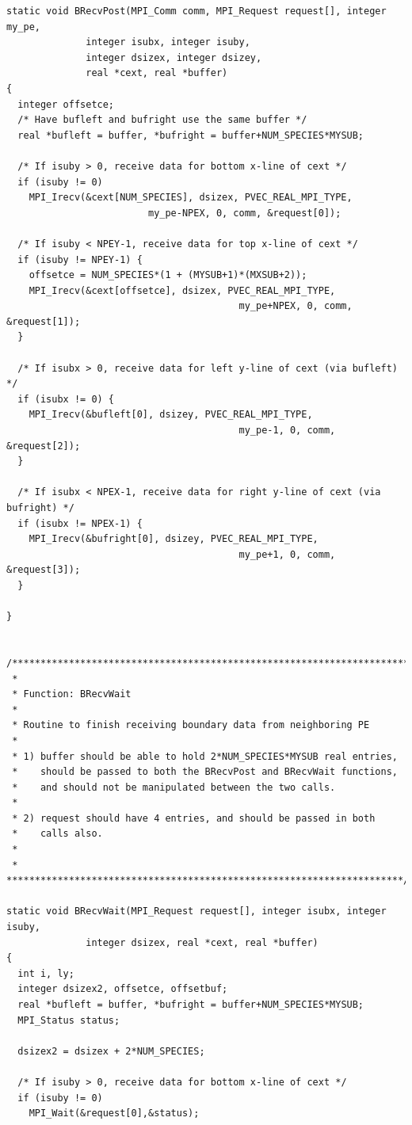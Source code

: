\documentclass[11pt]{article}
\begin{document}
\begin{verbatim}
static void BRecvPost(MPI_Comm comm, MPI_Request request[], integer my_pe,
		      integer isubx, integer isuby,
		      integer dsizex, integer dsizey,
		      real *cext, real *buffer)
{
  integer offsetce;
  /* Have bufleft and bufright use the same buffer */
  real *bufleft = buffer, *bufright = buffer+NUM_SPECIES*MYSUB;

  /* If isuby > 0, receive data for bottom x-line of cext */
  if (isuby != 0)
    MPI_Irecv(&cext[NUM_SPECIES], dsizex, PVEC_REAL_MPI_TYPE,
    					 my_pe-NPEX, 0, comm, &request[0]);

  /* If isuby < NPEY-1, receive data for top x-line of cext */
  if (isuby != NPEY-1) {
    offsetce = NUM_SPECIES*(1 + (MYSUB+1)*(MXSUB+2));
    MPI_Irecv(&cext[offsetce], dsizex, PVEC_REAL_MPI_TYPE,
                                         my_pe+NPEX, 0, comm, &request[1]);
  }

  /* If isubx > 0, receive data for left y-line of cext (via bufleft) */
  if (isubx != 0) {
    MPI_Irecv(&bufleft[0], dsizey, PVEC_REAL_MPI_TYPE,
                                         my_pe-1, 0, comm, &request[2]);
  }

  /* If isubx < NPEX-1, receive data for right y-line of cext (via bufright) */
  if (isubx != NPEX-1) {
    MPI_Irecv(&bufright[0], dsizey, PVEC_REAL_MPI_TYPE,
                                         my_pe+1, 0, comm, &request[3]);
  }

}


/***********************************************************************
 *
 * Function: BRecvWait
 *
 * Routine to finish receiving boundary data from neighboring PE
 *
 * 1) buffer should be able to hold 2*NUM_SPECIES*MYSUB real entries,
 *    should be passed to both the BRecvPost and BRecvWait functions,
 *    and should not be manipulated between the two calls.
 *
 * 2) request should have 4 entries, and should be passed in both
 *    calls also.
 *
 * **********************************************************************/

static void BRecvWait(MPI_Request request[], integer isubx, integer isuby,
		      integer dsizex, real *cext, real *buffer)
{
  int i, ly;
  integer dsizex2, offsetce, offsetbuf;
  real *bufleft = buffer, *bufright = buffer+NUM_SPECIES*MYSUB;
  MPI_Status status;

  dsizex2 = dsizex + 2*NUM_SPECIES;

  /* If isuby > 0, receive data for bottom x-line of cext */
  if (isuby != 0)
    MPI_Wait(&request[0],&status);


\end{verbatim}
\end{document}
